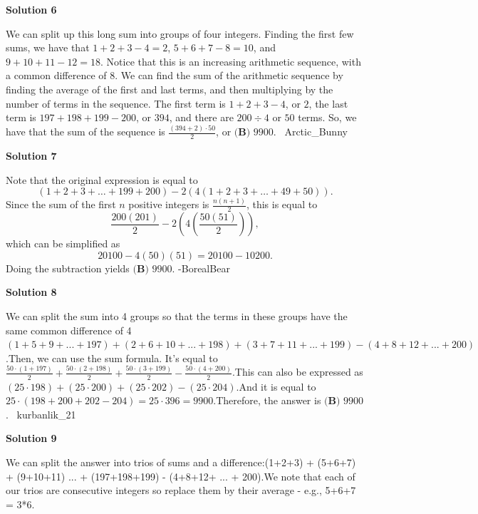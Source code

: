 \begin{enumerate}
 



\textbf{Solution 6}

We can split up this long sum into groups of four integers. Finding the first few sums, we have that  $1 + 2 + 3 - 4 = 2$, $5 + 6 + 7 - 8 = 10$, and $9 + 10 + 11 - 12 = 18$. Notice that this is an increasing arithmetic sequence, with a common difference of $8$. We can find the sum of the arithmetic sequence by finding the average of the first and last terms, and then multiplying by the number of terms in the sequence. The first term is  $1 + 2 + 3 - 4$, or $2$, the last term is $197 + 198 + 199 - 200$, or $394$, and there are $200\div 4$ or $50$ terms. So, we have that the sum of the sequence is $\frac{(394+2)\cdot 50}{2}$, or $\boxed{\textbf{(B) }9900}$. ~Arctic\_Bunny

 



\textbf{Solution 7}

Note that the original expression is equal to
 \[(1+2+3+\dots+199+200)-2(4(1+2+3+\dots+49+50)).\]Since the sum of the first $n$ positive integers is $\frac{n(n+1)}{2}$, this is equal to
 \[\frac{200(201)}{2}-2\left(4\left(\frac{50(51)}{2}\right)\right),\]which can be simplified as
 \[20100-4(50)(51)=20100-10200.\]Doing the subtraction yields $\boxed{\textbf{(B) }9900}$. -BorealBear

 



\textbf{Solution 8}

We can split the sum into 4 groups so that the terms in these groups have the same common difference of 4$(1+5+9+...+197)+(2+6+10+...+198)+(3+7+11+...+199)-(4+8+12+...+200)$.Then, we can use the sum formula. It's equal to$\frac{50\cdot(1+197)}{2} + \frac{50\cdot(2+198)}{2} + \frac{50\cdot(3+199)}{2} - \frac{50\cdot(4+200)}{2}$.This can also be expressed as$(25\cdot198) + (25\cdot200) + (25\cdot202) - (25\cdot204)$.And it is equal to $25\cdot(198+200+202-204) = 25\cdot396 = 9900$.Therefore, the answer is $\boxed{\textbf{(B) }9900}$. ~kurbanlik\_21

 



\textbf{Solution 9}

We can split the answer into trios of sums and a difference:(1+2+3) + (5+6+7) + (9+10+11) ... + (197+198+199) - (4+8+12+ ... + 200).We note that each of our trios are consecutive integers so replace them by their average - e.g., 5+6+7 = 3*6.


\end{enumerate}
